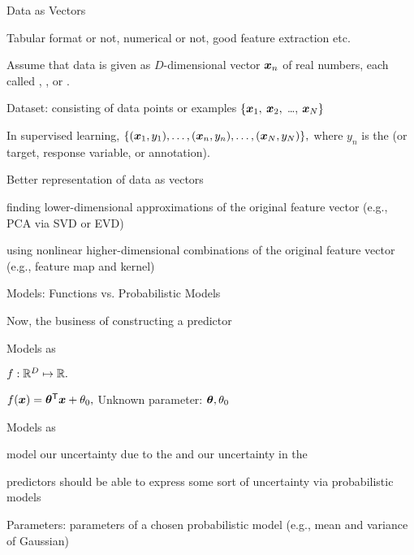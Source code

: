 \documentclass[handout,fleqn,aspectratio=169]{beamer}
\begin{document}
\begin{frame}{Data as Vectors}

\plitemsep 0.1in

\bci 

\item Tabular format or not, numerical or not, good feature extraction etc. 

\item Assume that data is given as $D$-dimensional vector $\bm{x}_n$ of real numbers, each called , , or .

\item Dataset: consisting of data points or examples $\{ \bm{x}_1,$ $\bm{x}_2,$ \ldots, $\bm{x}_N \}$
\item In supervised learning, $\{(\bm{x}_1, y_1), \ldots, (\bm{x}_n,y_n), \ldots, (\bm{x}_N,y_N) \},$ where $y_n$ is the  (or target, response variable, or annotation). 
\item Better representation of data as vectors
\bci
\item finding lower-dimensional approximations of the original feature vector (e.g., PCA via SVD or EVD)
\item using nonlinear higher-dimensional combinations of the original feature vector (e.g., feature map and kernel)
\eci
\eci
\end{frame}

\begin{frame}{Models: Functions vs. Probabilistic Models}

{
\plitemsep 0.07in

\bci 

\item Now, the business of constructing a predictor

\item Models as 
\bci
\item $f: {\mathbb R}^{D} \mapsto {\mathbb R}.$ 
\item \exam $f(\bm{x}) = {\bm{\theta}}^{\mathsf{T}}\bm{x} + \theta_0,$ Unknown parameter: $\bm{\theta},\theta_0$

\eci

\item Models as 

\bci
\item model our uncertainty due to the  and our uncertainty in the 

\item predictors should be able to express some sort of uncertainty via probabilistic models
\item Parameters: parameters of a chosen probabilistic model (e.g., mean and variance of Gaussian)
\eci

\eci

}
{
\vspace{-0.3cm}

}

\end{frame}
\end{document}
